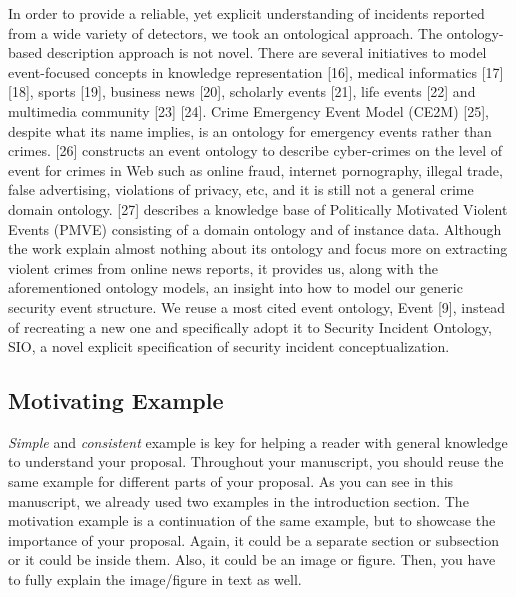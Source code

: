 \documentclass[sigconf]{acmart}
\begin{document}
In order to provide a reliable, yet explicit understanding of incidents reported from a wide variety of detectors, we took an ontological approach. The ontology-based description approach is not novel. There are several initiatives to model event-focused concepts in knowledge representation [16], medical informatics [17] [18], sports [19], business news [20], scholarly events [21], life events [22] and multimedia community [23] [24]. Crime Emergency Event Model (CE2M) [25], despite what its name implies, is an ontology for emergency events rather than crimes. [26] constructs an event ontology to describe cyber-crimes on the level of event for crimes in Web such as online fraud, internet pornography, illegal trade, false advertising, violations of privacy, etc, and it is still not a general crime domain ontology. [27] describes a knowledge base of Politically Motivated Violent Events (PMVE) consisting of a domain ontology and of instance data. Although the work explain almost nothing about its ontology and focus more on extracting violent crimes from online news reports, it provides us, along with the aforementioned ontology models, an insight into how to model our generic security event structure. We reuse a most cited event ontology, Event [9], instead of recreating a new one and specifically adopt it to Security Incident Ontology, SIO, a novel explicit specification of security incident conceptualization.

\subsection{Motivating Example}
{\color{blue}\textit{Simple} and \textit{consistent} example is key for helping a reader with general knowledge to understand your proposal. Throughout your manuscript, you should reuse the same example for different parts of your proposal. As you can see in this manuscript, we already used two examples in the introduction section. The motivation example is a continuation of the same example, but to showcase the importance of your proposal. Again, it could be a separate section or subsection or it could be inside them. Also, it could be an image or figure. Then, you have to fully explain the image/figure in text as well. }
\end{document}
